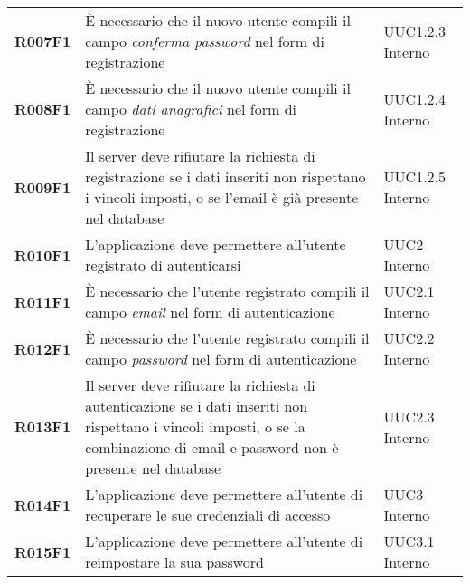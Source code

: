 \documentclass[../analisi-dei-requisiti.tex]{subfiles}
\begin{document}
\begin{center}
\begin{longtable}[H]{>{\centering\bfseries}m{3cm} >{\centering}m{10cm} >{\centering\arraybackslash}m{3cm}}
  R007F1                               & È necessario che il nuovo utente compili il campo \textit{conferma password} nel form di registrazione                                                                                                  & UUC1.2.3 Interno              \\
  R008F1                               & È necessario che il nuovo utente compili il campo \textit{dati anagrafici} nel form di registrazione                                                                                                    & UUC1.2.4 Interno              \\
  R009F1                               & Il server deve rifiutare la richiesta di registrazione se i dati inseriti non rispettano i vincoli imposti, o se l'email è già presente nel database                                                    & UUC1.2.5 Interno              \\
  R010F1                               & L'applicazione deve permettere all'utente registrato di autenticarsi                                                                                                                                    & UUC2 Interno                  \\
  R011F1                               & È necessario che l'utente registrato compili il campo \textit{email} nel form di autenticazione                                                                                                         & UUC2.1 Interno                \\
  R012F1                               & È necessario che l'utente registrato compili il campo \textit{password} nel form di autenticazione                                                                                                      & UUC2.2 Interno                \\
  R013F1                               & Il server deve rifiutare la richiesta di autenticazione se i dati inseriti non rispettano i vincoli imposti, o se la combinazione di email e password non è presente nel database                       & UUC2.3 Interno                \\
  R014F1                               & L'applicazione deve permettere all'utente di recuperare le sue credenziali di accesso                                                                                                                   & UUC3 Interno                  \\
  R015F1                               & L'applicazione deve permettere all'utente di reimpostare la sua password                                                                                                                                & UUC3.1 Interno                \\

\end{longtable}
\end{center}
\end{document}
